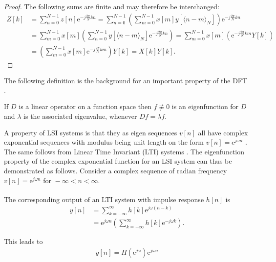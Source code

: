 \begin{proof}
The following sums are finite and may therefore be interchanged:
\begin{align*}
Z[k] &= \sum_{n=0}^{N-1} z[n] \text{e}^{-j\frac{2\pi}{N}kn} = \sum_{n=0}^{N-1} \left( \sum_{m=0}^{N-1} x[m] y[\langle n-m\rangle_N] \right) \text{e}^{-j\frac{2\pi}{N}kn} \\
&= \sum_{m=0}^{N-1} x[m] \left( \sum_{n=0}^{N-1} y[\langle n-m\rangle_N]\text{e}^{-j\frac{2\pi}{N}kn} \right) = \sum_{m=0}^{N-1} x[m] \left( \text{e}^{-j\frac{2\pi}{N}km}Y[k] \right) \\
&= \left( \sum_{m=0}^{N-1} x[m] \text{e}^{-j\frac{2\pi}{N}km} \right)Y[k] = X[k] Y[k].
\end{align*}
\end{proof}

The following definition is the background for an important property of the DFT \cite{Eigenfunctions}.

\begin{definition}[Eigenfunction]
If $D$ is a linear operator on a function space then $f \not\equiv 0$ is an eigenfunction for $D$ and $\lambda$ is the associated eigenvalue, whenever $Df = \lambda f$.
\end{definition}

A property of LSI systems is that they as eigen sequences $v[n]$ all have complex exponential sequences with modulus being unit length on the form $v[n] = \text{e}^{j \omega n}$ \cite{FSP}.\\ The same follows from Linear Time Invariant (LTI) systems \cite{DTSP}.
The eigenfunction property of the complex exponential function for an LSI system can thus be demonstrated as follows. Consider a complex sequence of radian frequency $v[n] = \text{e}^{j\omega n} \text{ for } -\infty < n < \infty$.
\\\\
The corresponding output of an LTI system with impulse response $h[n]$ is
\begin{align*}
y[n] 
&= \sum_{k=-\infty}^{\infty} h[k]\text{e}^{j\omega(n-k)} \nonumber \\ 
&= \text{e}^{j\omega n} \left(\sum_{k=-\infty}^{\infty} h[k]\text{e}^{-j\omega k} \right).
\end{align*}

This leads to
\begin{align}\label{eq:eigenfunction}
y[n] = H(\text{e}^{j \omega}) \text{e}^{j\omega n}
\end{align}

